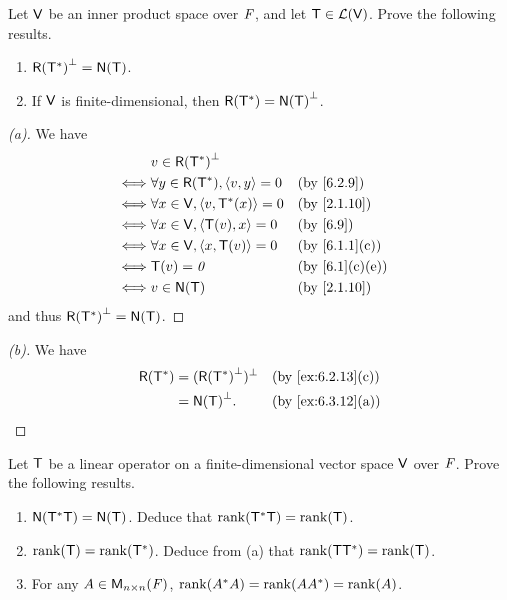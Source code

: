 \begin{ex}\label{ex:6.3.12}
  Let \(\mathsf{V}\) be an inner product space over \(\mathit{F}\), and let \(\mathsf{T} \in \mathcal{L}(\mathsf{V})\).
  Prove the following results.
  \begin{enumerate}
    \item \(\rg{\T^*}^{\perp} = \ns{\T}\).
    \item If \(\mathsf{V}\) is finite-dimensional, then \(\rg{\T^*} = \ns{\T}^{\perp}\).
  \end{enumerate}
\end{ex}

\begin{proof}[(a)]
  We have
  \begin{align*}
         & v \in \rg{\T^*}^{\perp}                                                   \\
    \iff & \forall y \in \rg{\T^*}, \inn{v, y} = 0 &  & \text{(by \cref{6.2.9})}     \\
    \iff & \forall x \in \V, \inn{v, \T^*(x)} = 0  &  & \text{(by \cref{2.1.10})}    \\
    \iff & \forall x \in \V, \inn{\T(v), x} = 0    &  & \text{(by \cref{6.9})}       \\
    \iff & \forall x \in \V, \inn{x, \T(v)} = 0    &  & \text{(by \cref{6.1.1}(c))}  \\
    \iff & \T(v) = \zv                             &  & \text{(by \cref{6.1}(c)(e))} \\
    \iff & v \in \ns{\T}                           &  & \text{(by \cref{2.1.10})}
  \end{align*}
  and thus \(\rg{\T^*}^{\perp} = \ns{\T}\).
\end{proof}

\begin{proof}[(b)]
  We have
  \begin{align*}
    \rg{\T^*} & = (\rg{\T^*}^{\perp})^{\perp} &  & \text{(by \cref{ex:6.2.13}(c))} \\
              & = \ns{\T}^{\perp}.            &  & \text{(by \cref{ex:6.3.12}(a))}
  \end{align*}
\end{proof}

\begin{ex}\label{ex:6.3.13}
  Let \(\mathsf{T}\) be a linear operator on a finite-dimensional vector space \(\mathsf{V}\) over \(\mathit{F}\).
  Prove the following results.
  \begin{enumerate}
    \item \(\ns{\T^* \T} = \ns{\T}\).
          Deduce that \(\rk{\T^* \T} = \rk{\T}\).
    \item \(\rk{\T} = \rk{\T^*}\).
          Deduce from (a) that \(\rk{\T \T^*} = \rk{\T}\).
    \item For any \(A \in \mathsf{M}_{{n} \times n}({\mathit{F}})\), \(\rk{A^* A} = \rk{A A^*} = \rk{A}\).
  \end{enumerate}
\end{ex}

